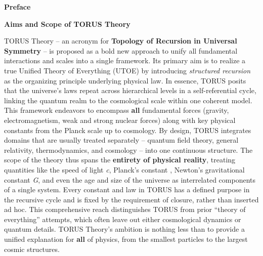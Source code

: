 \documentclass[
]{article}
\begin{document}
\textbf{Preface}

\textbf{Aims and Scope of TORUS Theory}

TORUS Theory -- an acronym for \textbf{Topology of Recursion in
Universal Symmetry} -- is proposed as a bold new approach to unify all
fundamental interactions and scales into a single framework. Its primary
aim is to realize a true Unified Theory of Everything (UTOE) by
introducing \emph{structured recursion} as the organizing principle
underlying physical law. In essence, TORUS posits that the universe's
laws repeat across hierarchical levels in a self-referential cycle,
linking the quantum realm to the cosmological scale within one coherent
model. This framework endeavors to encompass \textbf{all} fundamental
forces (gravity, electromagnetism, weak and strong nuclear forces) along
with key physical constants from the Planck scale up to
cosmology\hspace{0pt}. By design, TORUS integrates domains that are
usually treated separately -- quantum field theory, general relativity,
thermodynamics, and cosmology -- into one continuous structure. The
scope of the theory thus spans the \textbf{entirety of physical
reality}, treating quantities like the speed of light \emph{c}, Planck's
constant \emph{\hbar}, Newton's gravitational constant \emph{G}, and even
the age and size of the universe as interrelated components of a single
system. Every constant and law in TORUS has a defined purpose in the
recursive cycle and is fixed by the requirement of closure, rather than
inserted ad hoc\hspace{0pt}. This comprehensive reach distinguishes
TORUS from prior ``theory of everything'' attempts, which often leave
out either cosmological dynamics or quantum details. TORUS Theory's
ambition is nothing less than to provide a unified explanation for
\textbf{all} of physics, from the smallest particles to the largest
cosmic structures\hspace{0pt}.
\end{document}
